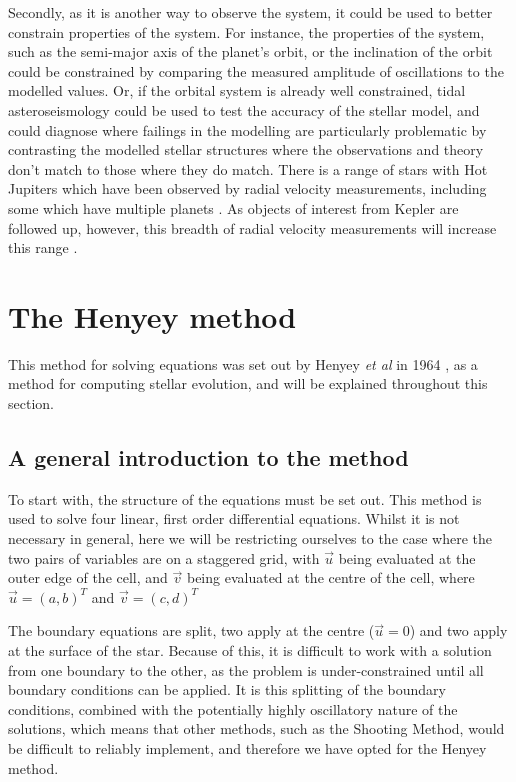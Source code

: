 \documentclass[11pt]{amsart}
\begin{document}
Secondly, as it is another way to observe the system, it could be used to better constrain properties of the system.  For instance, the properties of the system, such as the semi-major axis of the planet's orbit, or the inclination of the orbit could be constrained by comparing the measured amplitude of oscillations to the modelled values.  Or, if the orbital system is already well constrained, tidal asteroseismology could be used to test the accuracy of the stellar model, and could diagnose where failings in the modelling are particularly problematic by contrasting the modelled stellar structures where the observations and theory don't match to those where they do match.  There is a range of stars with Hot Jupiters which have been observed by radial velocity measurements, including some which have multiple planets \cite{NASAExoplanet}.  As objects of interest from Kepler are followed up, however, this  breadth of radial velocity measurements will increase this range \cite{Crouzet2017}.


\fi








\section{The Henyey method}   \label{Henyey}

This method for solving equations was set out by Henyey \textit{et al} in 1964 \cite{Henyey1964}, as a method for computing stellar evolution, and will be explained throughout this section. 

\subsection{A general introduction to the method}  \label{Henyey:General}

To start with, the structure of the equations must be set out.  This method is used to solve four linear, first order differential equations.  Whilst it is not necessary in general, here we will be restricting ourselves to the case where the two pairs of variables are on a staggered grid, with $\vec{u}$ being evaluated at the outer edge of the cell, and $\vec{v}$ being evaluated at the centre of the cell, where $\vec{u} = \left( a, b \right)^{T}$ and $\vec{v} = \left( c, d \right)^{T}$

The boundary equations are split, two apply at the centre ($\vec{u} = 0$) and two apply at the surface of the star.  Because of this, it is difficult to work with a solution from one boundary to the other, as the problem is under-constrained until all boundary conditions can be applied.  It is this splitting of the boundary conditions, combined with the potentially highly oscillatory nature of the solutions, which means that other methods, such as the Shooting Method, would be difficult to reliably implement, and therefore we have opted for the Henyey method.
\end{document}
